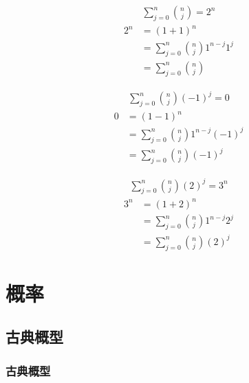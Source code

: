 \documentclass[12pt, openany, oneside]{book}
\begin{document}
\begin{tcolorbox}
	\begin{align}
		\sum_{j=0}^{n} {n \choose j} = 2^n
	\end{align}
	\begin{align*}
		2^n & = (1 + 1)^n                                \\
		    & = \sum_{j=0}^{n} {n \choose j} 1^{n-j} 1^j \\
		    & = \sum_{j=0}^{n} {n \choose j}
	\end{align*}
\end{tcolorbox}

\begin{tcolorbox}
	\begin{align}
		\sum_{j=0}^{n} {n \choose j} (-1)^j = 0
	\end{align}
	\begin{align*}
		0 & = (1 - 1)^n                                   \\
		  & = \sum_{j=0}^{n} {n \choose j} 1^{n-j} (-1)^j \\
		  & = \sum_{j=0}^{n} {n \choose j} (-1)^j
	\end{align*}
\end{tcolorbox}

\begin{tcolorbox}
	\begin{align}
		\sum_{j=0}^{n} {n \choose j} (2)^j = 3^n
	\end{align}
	\begin{align*}
		3^n & = (1 + 2)^n                                \\
		    & = \sum_{j=0}^{n} {n \choose j} 1^{n-j} 2^j \\
		    & = \sum_{j=0}^{n} {n \choose j} (2)^j
	\end{align*}
\end{tcolorbox}

\newpage

\chapter{概率}

\section{古典概型}

\subsection{古典概型}
\end{document}
